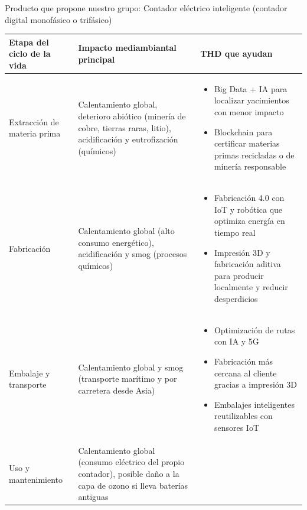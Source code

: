 
\begin{solution}
Producto que propone nuestro grupo:
Contador eléctrico inteligente (contador digital monofásico o trifásico)

\begin{center}
	
	\begin{tabular}{|p{3.2cm}|p{4.5cm}|p{5.5cm}|}
		\hline
		\textbf{Etapa del ciclo de la vida} & \textbf{Impacto mediambiantal principal} & \textbf{THD que ayudan} \\
		\hline
		Extracción de materia prima & Calentamiento global, deterioro abiótico (minería de cobre, tierras raras, litio), acidificación y eutrofización (químicos) & 
		\begin{itemize}[label=\textbullet, leftmargin=*, nosep]
			\item{Big Data + IA para localizar yacimientos con menor impacto}
			\item{Blockchain para certificar materias primas recicladas o de minería responsable} 
		\end{itemize} \\
		\hline
		Fabricación & Calentamiento global (alto consumo energético), acidificación y smog (procesos químicos)& 

		\begin{itemize}[label=\textbullet, leftmargin=*, nosep]
			\item{Fabricación 4.0 con IoT y robótica que optimiza energía en tiempo real}
			\item{Impresión 3D y fabricación aditiva para producir localmente y reducir desperdicios} 
		\end{itemize} 
		\\
		\hline
		Embalaje y transporte & Calentamiento global y smog (transporte marítimo y por carretera desde Asia)&
		\begin{itemize}[label=\textbullet, leftmargin=*, nosep]
			\item{Optimización de rutas con IA y 5G}
			\item{Fabricación más cercana al cliente gracias a impresión 3D}
			\item{Embalajes inteligentes reutilizables con sensores IoT}
		\end{itemize} 
		\\
		\hline
		Uso y mantenimiento &Calentamiento global (consumo eléctrico del propio contador), posible daño a la capa de ozono si lleva baterías antiguas &


\end{tabular}
\end{center}
\end{solution}
